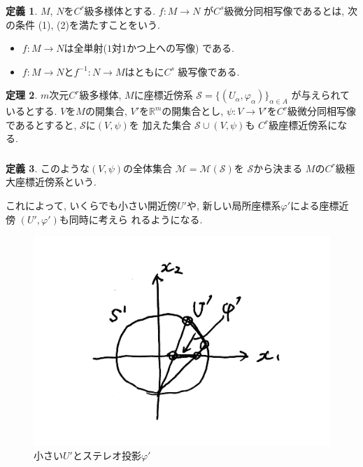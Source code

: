 \documentclass[dvipdfmx,cjk]{beamer}
\theoremstyle{definition}
\newtheorem{dfn}{\textbf{ 定義 }}
\newtheorem{thm}[dfn]{\textbf{ 定理 }}
\begin{document}
\begin{frame}
  \frametitle{}
  \begin{dfn}\label{def:C^s deffeomorphism}
    $M$, $N$を$C^r$級多様体とする. $f:M\to N$
    が$C^s$級微分同相写像であるとは, 次の条件
    (1), (2)を満たすことをいう. 
    \begin{itemize}
        \item[(1)]
        $f:M\to N$は全単射($1$対$1$かつ上への写像)
        である. 
        \item[(2)] 
        $f:M\to N$と$f^{-1}:N\to M$はともに$C^s$
        級写像である. 
    \end{itemize}
\end{dfn}
\begin{thm}
  $m$次元$C^r$級多様体, $M$に座標近傍系
  $\mathcal{S}=
   \{(U_\alpha, \varphi_\alpha)\}_{\alpha\in A}$
   が与えられているとする. 
   $V$を$M$の開集合, 
   $V'$を$\mathbb{R}^m$の開集合とし,  
   $\psi:V\to V'$を$C^r$級微分同相写像
   であるとすると, $\mathcal{S}$に$(V,\psi)$を
   加えた集合
   $\mathcal{S}\cup (V,\psi)$も
   $C^r$級座標近傍系になる. 
   \end{thm}
\end{frame}
\begin{frame}
  \frametitle{}
  \begin{dfn}
  このような$(V,\psi)$の全体集合
  $\mathcal{M}=\mathcal{M}(\mathcal{S})$を
  $\mathcal{S}$から決まる
  $M$の$C^r$級極大座標近傍系という.
  \end{dfn}
  これによって, いくらでも小さい開近傍$U'$や, 
  新しい局所座標系$\varphi '$による座標近傍
  $(U',\varphi ')$も同時に考えら
  れるようになる. 
  \begin{figure}[H]
    \centering
    \includegraphics[keepaspectratio, scale=0.25]{stereoprojection.pdf}
    \caption{小さい$U'$とステレオ投影$\varphi '$}
    \label{}
\end{figure}
\end{frame}
\end{document}
